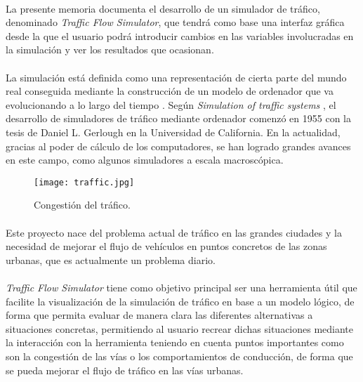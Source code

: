 \paragraph{}
La presente memoria documenta el desarrollo de un simulador de tráfico, denominado \emph{Traffic Flow Simulator}, que tendrá como base una interfaz gráfica desde la que el usuario podrá introducir cambios en las variables involucradas en la simulación y ver los resultados que ocasionan.

\paragraph{}
La simulación está definida como una representación de cierta parte del mundo real conseguida mediante la construcción de un modelo de ordenador que va evolucionando a lo largo del tiempo \cite{Drew1968}. Según \emph{Simulation of traffic systems} \cite{Pursula}, el desarrollo de simuladores de tráfico mediante ordenador comenzó en 1955 con la tesis de Daniel L. Gerlough en la Universidad de California. En la actualidad, gracias al poder de cálculo de los computadores, se han logrado grandes avances en este campo, como algunos simuladores a escala macroscópica.

	\begin{figure}[H]
		\centering
			\texttt{[image: traffic.jpg]}
		\caption{Congestión del tráfico.}
		\label{fig:TrafficJam}
	\end{figure}

\paragraph{}
Este proyecto nace del problema actual de tráfico en las grandes ciudades y la necesidad de mejorar el flujo de vehículos en puntos concretos de las zonas urbanas, que es actualmente un problema diario.

\paragraph{}
\emph{Traffic Flow Simulator} tiene como objetivo principal ser una herramienta útil que facilite la visualización de la simulación de tráfico en base a un modelo lógico, de forma que permita evaluar de manera clara las diferentes alternativas a situaciones concretas, permitiendo al usuario recrear dichas situaciones mediante la interacción con la herramienta teniendo en cuenta puntos importantes como son la congestión de las vías o los comportamientos de conducción, de forma que se pueda mejorar el flujo de tráfico en las vías urbanas.

